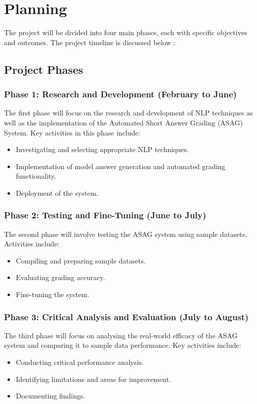 \documentclass[a4paper,10pt]{article}
\begin{document}
\section{Planning}
The project will be divided into four main phases, each with specific objectives and outcomes. The project timeline is discussed below :

\subsection{Project Phases}

\subsubsection{Phase 1: Research and Development (February to June)}
The first phase will focus on the research and development of NLP techniques as well as the implementation of the Automated Short Answer Grading (ASAG) System. Key activities in this phase include:
\begin{itemize}
    \item Investigating and selecting appropriate NLP techniques.
    \item Implementation of model answer generation and automated grading functionality.
    \item Deployment of the system.
\end{itemize}

\subsubsection{Phase 2: Testing and Fine-Tuning (June to July)}
The second phase will involve testing the ASAG system using sample datasets. Activities include:
\begin{itemize}
    \item Compiling and preparing sample datasets.
    \item Evaluating grading accuracy.
    \item Fine-tuning the system.
\end{itemize}

\subsubsection{Phase 3: Critical Analysis and Evaluation (July to August)}
The third phase will focus on analysing the real-world efficacy of the ASAG system and comparing it to sample data performance. Key activities include:
\begin{itemize}
    \item Conducting critical performance analysis.
    \item Identifying limitations and areas for improvement.
    \item Documenting findings.
\end{itemize}
\end{document}
